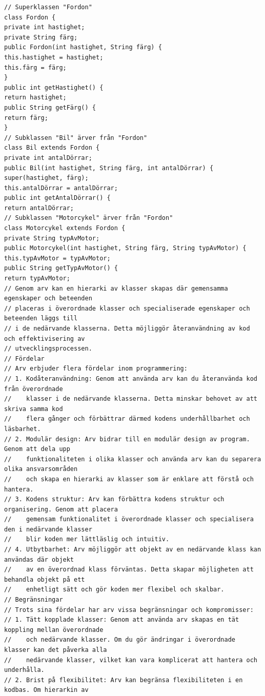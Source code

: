 \begin{verbatim}
// Superklassen "Fordon"
class Fordon {
private int hastighet;
private String färg;
public Fordon(int hastighet, String färg) {
this.hastighet = hastighet;
this.färg = färg;
}
public int getHastighet() {
return hastighet;
public String getFärg() {
return färg;
}
// Subklassen "Bil" ärver från "Fordon"
class Bil extends Fordon {
private int antalDörrar;
public Bil(int hastighet, String färg, int antalDörrar) {
super(hastighet, färg);
this.antalDörrar = antalDörrar;
public int getAntalDörrar() {
return antalDörrar;
// Subklassen "Motorcykel" ärver från "Fordon"
class Motorcykel extends Fordon {
private String typAvMotor;
public Motorcykel(int hastighet, String färg, String typAvMotor) {
this.typAvMotor = typAvMotor;
public String getTypAvMotor() {
return typAvMotor;
// Genom arv kan en hierarki av klasser skapas där gemensamma egenskaper och beteenden
// placeras i överordnade klasser och specialiserade egenskaper och beteenden läggs till
// i de nedärvande klasserna. Detta möjliggör återanvändning av kod och effektivisering av
// utvecklingsprocessen.
// Fördelar
// Arv erbjuder flera fördelar inom programmering:
// 1. Kodåteranvändning: Genom att använda arv kan du återanvända kod från överordnade
//    klasser i de nedärvande klasserna. Detta minskar behovet av att skriva samma kod
//    flera gånger och förbättrar därmed kodens underhållbarhet och läsbarhet.
// 2. Modulär design: Arv bidrar till en modulär design av program. Genom att dela upp
//    funktionaliteten i olika klasser och använda arv kan du separera olika ansvarsområden
//    och skapa en hierarki av klasser som är enklare att förstå och hantera.
// 3. Kodens struktur: Arv kan förbättra kodens struktur och organisering. Genom att placera
//    gemensam funktionalitet i överordnade klasser och specialisera den i nedärvande klasser
//    blir koden mer lättläslig och intuitiv.
// 4. Utbytbarhet: Arv möjliggör att objekt av en nedärvande klass kan användas där objekt
//    av en överordnad klass förväntas. Detta skapar möjligheten att behandla objekt på ett
//    enhetligt sätt och gör koden mer flexibel och skalbar.
// Begränsningar
// Trots sina fördelar har arv vissa begränsningar och kompromisser:
// 1. Tätt kopplade klasser: Genom att använda arv skapas en tät koppling mellan överordnade
//    och nedärvande klasser. Om du gör ändringar i överordnade klasser kan det påverka alla
//    nedärvande klasser, vilket kan vara komplicerat att hantera och underhålla.
// 2. Brist på flexibilitet: Arv kan begränsa flexibiliteten i en kodbas. Om hierarkin av

\end{verbatim}
